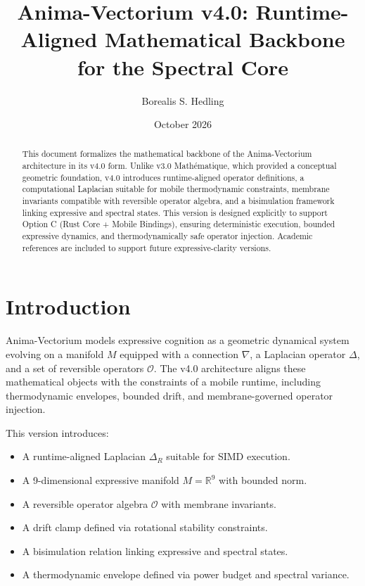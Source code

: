 \documentclass[11pt]{article}
\title{Anima-Vectorium v4.0: Runtime-Aligned Mathematical Backbone for the Spectral Core}
\author{Borealis S. Hedling}
\date{October 2026}
\begin{document}
\maketitle

\begin{abstract}
This document formalizes the mathematical backbone of the Anima-Vectorium
architecture in its v4.0 form. Unlike v3.0 Mathématique, which provided a
conceptual geometric foundation, v4.0 introduces runtime-aligned operator
definitions, a computational Laplacian suitable for mobile thermodynamic
constraints, membrane invariants compatible with reversible operator algebra,
and a bisimulation framework linking expressive and spectral states. This
version is designed explicitly to support Option C (Rust Core + Mobile
Bindings), ensuring deterministic execution, bounded expressive dynamics, and
thermodynamically safe operator injection. Academic references are included to
support future expressive-clarity versions.
\end{abstract}

\section{Introduction}

Anima-Vectorium models expressive cognition as a geometric dynamical system
evolving on a manifold $M$ equipped with a connection $\nabla$, a Laplacian
operator $\Delta$, and a set of reversible operators $\mathcal{O}$. The v4.0
architecture aligns these mathematical objects with the constraints of a
mobile runtime, including thermodynamic envelopes, bounded drift, and
membrane-governed operator injection.

This version introduces:
\begin{itemize}
    \item A runtime-aligned Laplacian $\Delta_R$ suitable for SIMD execution.
    \item A 9-dimensional expressive manifold $M = \mathbb{R}^9$ with bounded
    norm.
    \item A reversible operator algebra $\mathcal{O}$ with membrane invariants.
    \item A drift clamp defined via rotational stability constraints.
    \item A bisimulation relation linking expressive and spectral states.
    \item A thermodynamic envelope defined via power budget and spectral variance.
\end{itemize}
\end{document}
